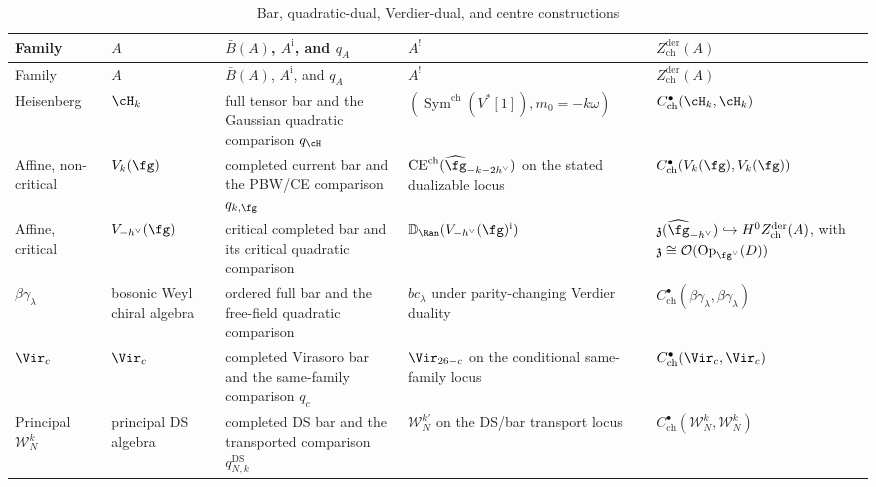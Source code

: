 {\scriptsize
\renewcommand{\arraystretch}{1.18}
\begin{longtable}{@{}p{}p{}p{}p{}p{}@{}}
\caption{Bar, quadratic-dual, Verdier-dual, and centre constructions}
\label{tab:standard-family-five-object-package}\\
\toprule
Family & \(A\) & \(\bar B(A)\), \(A^{\mathrm i}\), and \(q_A\) &
\(A^!\) & \(Z^{\mathrm{der}}_{\mathrm{ch}}(A)\) \\
\midrule
\endfirsthead
\toprule
Family & \(A\) & \(\bar B(A)\), \(A^{\mathrm i}\), and \(q_A\) &
\(A^!\) & \(Z^{\mathrm{der}}_{\mathrm{ch}}(A)\) \\
\midrule
\endhead
Heisenberg &
\(\cH_k\) &
full tensor bar and the Gaussian quadratic comparison \(q_{\cH}\) &
\((\operatorname{Sym}^{\mathrm{ch}}(V^*[1]),m_0=-k\omega)\) &
\(C^\bullet_{\mathrm{ch}}(\cH_k,\cH_k)\) \\

Affine, non-critical &
\(V_k(\fg)\) &
completed current bar and the PBW/CE comparison \(q_{k,\fg}\) &
\(\mathrm{CE}^{\mathrm{ch}}
(\widehat{\fg}_{-k-2h^\vee})\) on the stated dualizable locus &
\(C^\bullet_{\mathrm{ch}}(V_k(\fg),V_k(\fg))\) \\

Affine, critical &
\(V_{-h^\vee}(\fg)\) &
critical completed bar and its critical quadratic comparison &
\(\mathbb D_{\Ran}(V_{-h^\vee}(\fg)^{\mathrm i})\) &
\(\mathfrak z(\widehat{\fg}_{-h^\vee})
\hookrightarrow H^0Z^{\mathrm{der}}_{\mathrm{ch}}(A)\), with
\(\mathfrak z\cong\mathcal O(\mathrm{Op}_{\fg^\vee}(D))\) \\

\(\beta\gamma_\lambda\) &
bosonic Weyl chiral algebra &
ordered full bar and the free-field quadratic comparison &
\(bc_\lambda\) under parity-changing Verdier duality &
\(C^\bullet_{\mathrm{ch}}(\beta\gamma_\lambda,\beta\gamma_\lambda)\) \\

\(\Vir_c\) &
\(\Vir_c\) &
completed Virasoro bar and the same-family comparison \(q_c\) &
\(\Vir_{26-c}\) on the conditional same-family locus &
\(C^\bullet_{\mathrm{ch}}(\Vir_c,\Vir_c)\) \\

Principal \(\mathcal W_N^k\) &
principal DS algebra &
completed DS bar and the transported comparison \(q_{N,k}^{\mathrm{DS}}\) &
\(\mathcal W_N^{k'}\) on the DS/bar transport locus &
\(C^\bullet_{\mathrm{ch}}(\mathcal W_N^k,\mathcal W_N^k)\) \\


\end{longtable}}
